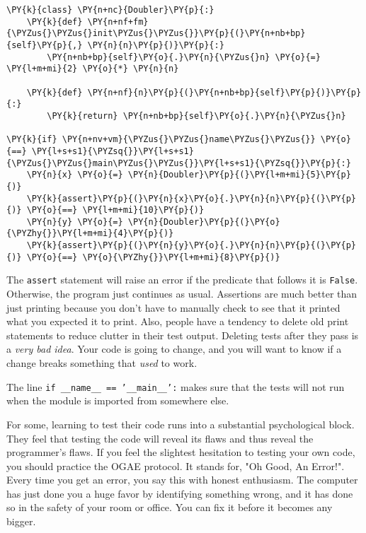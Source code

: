 \begin{Verbatim}[commandchars=\\\{\}]
\PY{k}{class} \PY{n+nc}{Doubler}\PY{p}{:}
    \PY{k}{def} \PY{n+nf+fm}{\PYZus{}\PYZus{}init\PYZus{}\PYZus{}}\PY{p}{(}\PY{n+nb+bp}{self}\PY{p}{,} \PY{n}{n}\PY{p}{)}\PY{p}{:}
        \PY{n+nb+bp}{self}\PY{o}{.}\PY{n}{\PYZus{}n} \PY{o}{=} \PY{l+m+mi}{2} \PY{o}{*} \PY{n}{n}

    \PY{k}{def} \PY{n+nf}{n}\PY{p}{(}\PY{n+nb+bp}{self}\PY{p}{)}\PY{p}{:}
        \PY{k}{return} \PY{n+nb+bp}{self}\PY{o}{.}\PY{n}{\PYZus{}n}

\PY{k}{if} \PY{n+nv+vm}{\PYZus{}\PYZus{}name\PYZus{}\PYZus{}} \PY{o}{==} \PY{l+s+s1}{\PYZsq{}}\PY{l+s+s1}{\PYZus{}\PYZus{}main\PYZus{}\PYZus{}}\PY{l+s+s1}{\PYZsq{}}\PY{p}{:}
    \PY{n}{x} \PY{o}{=} \PY{n}{Doubler}\PY{p}{(}\PY{l+m+mi}{5}\PY{p}{)}
    \PY{k}{assert}\PY{p}{(}\PY{n}{x}\PY{o}{.}\PY{n}{n}\PY{p}{(}\PY{p}{)} \PY{o}{==} \PY{l+m+mi}{10}\PY{p}{)}
    \PY{n}{y} \PY{o}{=} \PY{n}{Doubler}\PY{p}{(}\PY{o}{\PYZhy{}}\PY{l+m+mi}{4}\PY{p}{)}
    \PY{k}{assert}\PY{p}{(}\PY{n}{y}\PY{o}{.}\PY{n}{n}\PY{p}{(}\PY{p}{)} \PY{o}{==} \PY{o}{\PYZhy{}}\PY{l+m+mi}{8}\PY{p}{)}
\end{Verbatim}



The \texttt{assert} statement will raise an error if the predicate that follows it is \texttt{False}.  Otherwise, the program just continues as usual.  Assertions are much better than just printing because you don’t have to manually check to see that it printed what you expected it to print.  Also, people have a tendency to delete old print statements to reduce clutter in their test output.  Deleting tests after they pass is a \emph{very bad idea}.  Your code is going to change, and you will want to know if a change breaks something that \emph{used} to work.


The line \texttt{if \_\_name\_\_ == '\_\_main\_\_':} makes sure that the tests will not run when the module is imported from somewhere else.


For some, learning to test their code runs into a substantial psychological block.  They feel that testing the code will reveal its flaws and thus reveal the programmer’s flaws.  If you feel the slightest hesitation to testing your own code, you should practice the OGAE protocol.  It stands for, "Oh Good, An Error!".  Every time you get an error, you say this with honest enthusiasm.  The computer has just done you a huge favor by identifying something wrong, and it has done so in the safety of your room or office.  You can fix it before it becomes any bigger.

